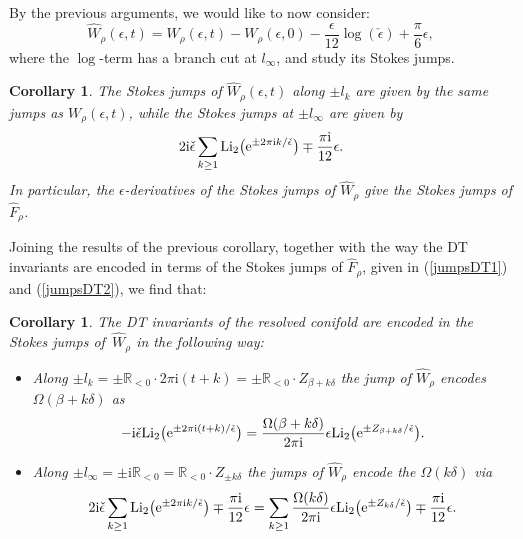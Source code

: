 \documentclass[pdftex]{sigma}
\numberwithin{equation}{section}
\newtheorem{Corollary}[Theorem]{Corollary}
\begin{document}
By the previous arguments, we would like to now consider:
\begin{equation*}
 \widehat{W}_{\rho}(\epsilon,t)=W_{\rho}(\epsilon,t)-W_{\rho}(\epsilon,0) -\frac{\epsilon}{12}\log(\check\epsilon)+\frac{\pi}{6}\epsilon,
\end{equation*}
where the $\log$-term has a branch cut at $l_{\infty}$, and study its Stokes jumps.

\begin{Corollary}
The Stokes jumps of $\widehat{W}_{\rho}(\epsilon,t)$ along $\pm l_{k}$ are given by the same jumps as $W_{\rho}(\epsilon,t)$, while the Stokes jumps at $\pm l_{\infty}$ are given by
\begin{equation*}
 2\mathrm{i}\check{\epsilon}\sum_{k\geq 1} \mathrm{Li}_2\big({\rm e}^{\pm 2\pi \mathrm{i} k/\check\epsilon}\big) \mp \frac{\pi \mathrm{i} }{12}\epsilon.
\end{equation*}
In particular, the $\epsilon$-derivatives of the Stokes jumps of $\hat{W}_{\rho}$ give the Stokes jumps of $\hat{F}_{\rho}$.
\end{Corollary}

Joining the results of the previous corollary, together with the way the DT invariants are encoded in terms of the Stokes jumps of $\hat{F}_{\rho}$, given in (\ref{jumpsDT1}) and (\ref{jumpsDT2}), we find that:

\begin{Corollary}
The DT invariants of the resolved conifold are encoded in the Stokes jumps of~$\hat{W}_{\rho}$ in the following way:

\begin{itemize}
\item Along $\pm l_k= \pm \mathbb{R}_{<0}\cdot 2\pi \mathrm{i}(t+k)=\pm \mathbb{R}_{<0}\cdot Z_{\beta +k\delta}$ the jump of $\hat{W}_{\rho}$ encodes $\Omega(\beta+k\delta)$ as
 \begin{equation*}
 -\mathrm{i}\check{\epsilon}\mathrm{Li}_2\big({\rm e}^{\pm 2\pi \mathrm{i}(t+k)/\check{\epsilon}}\big)=\frac{ \Omega(\beta+k\delta)}{2\pi \mathrm{i}}\epsilon \mathrm{Li}_2\big({\rm e}^{\pm Z_{\beta+k\delta}/\check{\epsilon}}\big).
 \end{equation*}
 \item Along $\pm l_{\infty}=\pm \mathrm{i}\mathbb{R}_{<0}= \mathbb{R}_{<0}\cdot Z_{\pm k\delta}$ the jumps of $\hat{W}_{\rho}$ encode the $\Omega(k\delta)$ via
 \begin{equation*}
 2\mathrm{i}\check{\epsilon}\sum_{k\geq 1} \mathrm{Li}_2\big({\rm e}^{\pm 2\pi \mathrm{i} k/\check\epsilon}\big) \mp \frac{\pi \mathrm{i} }{12}\epsilon =\sum_{k\geq 1}\frac{\Omega(k\delta)}{2\pi \mathrm{i}}\epsilon \mathrm{Li}_2\big({\rm e}^{\pm Z_{k\delta}/\check{\epsilon}}\big)\mp \frac{\pi \mathrm{i} }{12}\epsilon.
 \end{equation*}
\end{itemize}
\end{Corollary}
\end{document}
